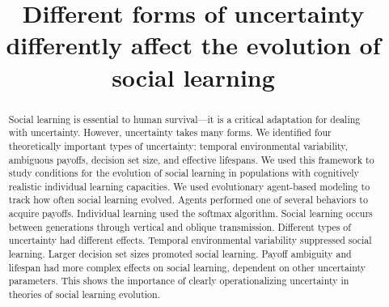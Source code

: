 \documentclass[letterpaper,11.5pt]{scrartcl}
\title{Different forms of uncertainty differently affect the evolution of social learning}
\author{{}}
\begin{document}
\maketitle

\newcommand{\pisub}[1]{\pi_{\mathrm{#1}}}
\newcommand{\pilow}{\pisub{low}}
\newcommand{\pihigh}{\pisub{high}}
\newcommand{\piI}{\langle \pisub{I} \rangle}
\newcommand{\piS}{\langle \pisub{S} \rangle}
\newcommand{\ledger}{\bar\pi_{ib}}

\newcommand{\meanvar}[1]{\langle #1 \rangle}
\newcommand{\meansl}{\meanvar{s}}
\newcommand{\meanpi}{\meanvar{\pi}}
\newcommand{\meansoc}{\meanvar{\pi_\mathrm{S}}}
\newcommand{\meanasoc}{\meanvar{\pi_\mathrm{A}}}
\newcommand{\meanT}{\meanvar{T}}

\newcommand{\bandit}{\text{Bandit}_b(0, 1)}

\begin{abstract}
Social learning is essential to human survival---it is a critical adaptation for dealing with uncertainty. However, uncertainty takes many forms. We identified four theoretically important types of uncertainty: temporal environmental variability, ambiguous payoffs, decision set size, and effective lifespans. We used this framework to study conditions for the evolution of social learning in populations with cognitively realistic individual learning capacities.
We used evolutionary agent-based modeling to track how often social learning evolved. Agents performed one of several behaviors to acquire payoffs. Individual learning used the softmax algorithm. Social learning occurs between generations  through vertical and oblique transmission.
Different types of uncertainty had different effects. Temporal environmental variability suppressed social learning. Larger decision set sizes promoted social learning. Payoff ambiguity and lifespan had more complex effects on social learning, dependent on other uncertainty parameters.
This shows the importance of clearly operationalizing uncertainty in theories of social learning evolution.

\end{abstract}
\end{document}
